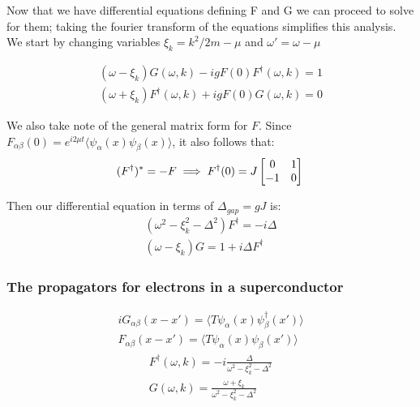 \documentclass{beamer}
\begin{document}
\begin{frame}
Now that we have differential equations defining F and G we can proceed to solve for them; taking the fourier transform of the equations simplifies this analysis. \\
We start by changing variables $\xi_k = k^2/2m -\mu$ and $\omega ' = \omega-\mu$

\begin{eqnarray*}
(\omega - \xi_k)G(\omega,k)-igF(0)F^{\dagger}(\omega,k)=1 \\
(\omega + \xi_k)F^{\dagger}(\omega,k)+igF(0)G(\omega,k)=0
\end{eqnarray*}
\end{frame}



\begin{frame}
We also take note of the general matrix form for $F$.
Since $F_{\alpha\beta}(0) = e^{i2\mu t}\langle\psi_{\alpha}(x)\psi_{\beta}(x)\rangle$, it also follows that:
\begin{equation*}
(F^{\dagger})^* = -F
\implies F^{\dagger}(0) = J
\begin{bmatrix}
0 & 1 \\
-1 & 0
\end{bmatrix} \\

\end{equation*}

Then our differential equation in terms of $\Delta_{gap} = gJ$ is:
\begin{eqnarray*}
(\omega^2 -\xi_k^2-\Delta^2) F^{\dagger}= -i\Delta \\
(\omega - \xi_k)G = 1 +i\Delta F^{\dagger}
\end{eqnarray*}


\end{frame}

\begin{frame}
\frametitle{The propagators for electrons in a superconductor}
\begin{eqnarray*}
iG_{\alpha\beta}(x-x') = \langle T \psi_{\alpha}(x) \psi^{\dagger}_{\beta}(x')\rangle \\
F_{\alpha\beta}(x-x') = \langle T\psi_{\alpha}(x) \psi_{\beta}(x')\rangle
\end{eqnarray*}
\begin{eqnarray*}
F^{\dagger}(\omega,k)= -i\frac{\Delta}{\omega^2-\xi_k^2 - \Delta^2} \\
G(\omega, k) = \frac{\omega+\xi_k}{\omega^2-\xi_k^2 - \Delta^2}
\end{eqnarray*}
\end{frame}
\end{document}
